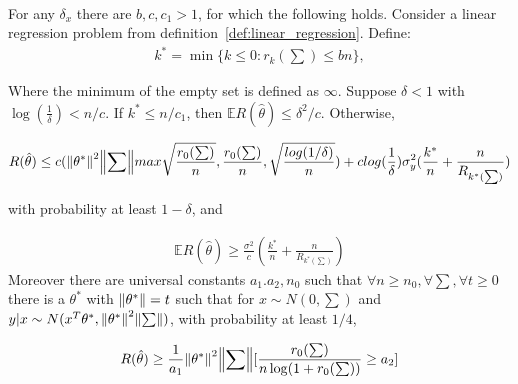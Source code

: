 \documentclass[a4paper,12pt]{scrartcl}
\theoremstyle{definition}
\begin{document}
\begin{thm}\ \\
	For any $\delta_x$ there are $b,c,c_1 > 1$, for which the following holds. Consider a linear regression problem from definition~\ref{def:linear_regression}. Define:
\begin{equation}
\begin{aligned}
k^* = \min \{k \leq 0: r_k(\sum) \leq bn\},
\end{aligned}
\end{equation}

Where the minimum of the empty set is defined as $\infty$. Suppose $\delta < 1$ with $\log(\frac{1}{\delta}) < n/c$. If $k^* \leq n/c_1$, then $\mathbb{E}R(\hat{\theta}) \leq \delta^2/c.$ Otherwise,

\begin{equation}
\begin{aligned}
R(\hat{\theta}) \leq c(\norm{\theta^*}^2\norm{\sum}max{\sqrt{\frac{r_0(\sum)}{n}},\frac{r_0(\sum)}{n},\sqrt{\frac{log(1/\delta)}{n}}}) + clog(\frac{1}{\delta})\sigma_y^2(\frac{k^*}{n} + \frac{n}{R_{k^*(\sum)}}) \\
\end{aligned}
\end{equation}

with probability at least $1 - \delta$, and 

\begin{equation}
\begin{aligned}
\mathbb{E}R(\hat{\theta}) \geq \frac{\sigma^2}{c} (\frac{k^*}{n} + \frac{n}{R_{k^*(\sum)}}) 
\end{aligned}
\end{equation}
Moreover there are universal constants $a_1.a_2,n_0$ such that $\forall n \geq n_0, \forall \sum, \forall t \geq 0$ there is a $\theta^*$ with $\norm{\theta^*} = t$ such that for $x \sim N(0,\sum)$ and $y|x \sim N(x^T\theta^*,\norm{\theta^*}^2\norm{\sum})$, with probability at least $1/4$,

\begin{equation}
\begin{aligned}
R(\hat{\theta})\geq \frac{1}{a_1}\norm{\theta^*}^2\norm{\sum}[\frac{r_0(\sum)}{n\log(1+r_0(\sum))} \geq a_2]
\end{aligned}
\end{equation}
 
\end{thm}
\end{document}
